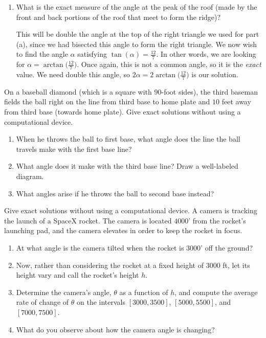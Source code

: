 \documentclass{ximera}
\begin{document}
\begin{example}
\begin{enumerate}
\item What is the exact measure of the angle at the peak of the roof (made by the front and back portions of the roof that meet to form the ridge)?\\
%
\begin{explanation}
This will be double the angle at the top of the right triangle we used for part (a), since we had bisected this angle to form the right triangle. We now wish to find the angle $\alpha$ satisfying $\tan(\alpha) = \frac{12}{7}$. In other words, we are looking for $\alpha = \arctan\!\Big(\frac{12}{7}\Big)$. Once again, this is not a common angle, so it is the {\em exact} value. We need double this angle, so $2\alpha = 2\arctan\!\Big(\frac{12}{7}\Big)$ is our solution.
\end{explanation}
\end{enumerate}
\end{example}

\begin{exploration}
On a baseball diamond (which is a square with $90$-foot sides), the third baseman fields the ball right on the line from third base to home plate and $10$ feet away from third base (towards home plate).  
Give exact solutions without using a computational device.%
%
\begin{enumerate}
\item When he throws the ball to first base, what angle does the line the ball travels make with the first base line?
%
\item What angle does it make with the third base line? Draw a well-labeled diagram.
%
\item What angles arise if he throws the ball to second base instead?
%
\end{enumerate}
\end{exploration}

\begin{exploration}
Give exact solutions without using a computational device.
%
A camera is tracking the launch of a SpaceX rocket. The camera is located $4000$' from the rocket's launching pad, and the camera elevates in order to keep the rocket in focus. 
\begin{enumerate}
\item At what angle is the camera tilted when the rocket is $3000$' off the ground?
%
\item[] Now, rather than considering the rocket at a fixed height of $3000$ ft, let its height vary and call the rocket's height $h$. 

\item Determine the camera's angle, $\theta$ as a function of $h$, and compute the average rate of change of $\theta$ on the intervals $[3000,3500]$, $[5000,5500]$, and $[7000,7500]$. 
%
\item What do you observe about how the camera angle is changing?
%
\end{enumerate}
\end{exploration}
\end{document}

